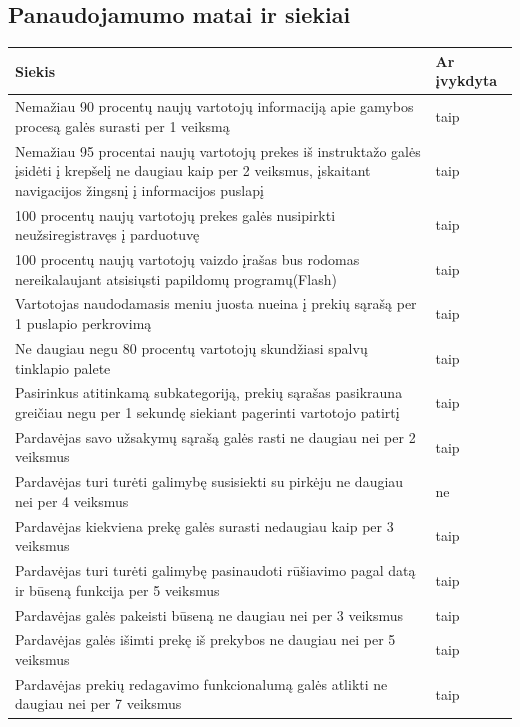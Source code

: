 \documentclass[oneside]{VUMIFPSkursinis}
\begin{document}
\subsection{Panaudojamumo matai ir siekiai}
\begin{center}
    \begin{tabular}{ |p{12cm}| p{3cm} |}
    \hline
	Siekis &Ar įvykdyta \\ \hline
	Nemažiau 90 procentų naujų vartotojų informaciją apie gamybos procesą galės surasti per 1 veiksmą& taip \\ \hline
	Nemažiau 95 procentai naujų vartotojų prekes iš instruktažo galės įsidėti į krepšelį ne daugiau kaip per 2 veiksmus, įskaitant navigacijos žingsnį į informacijos puslapį& taip \\ \hline
	100 procentų naujų vartotojų prekes galės nusipirkti neužsiregistravęs į parduotuvę& taip \\ \hline
	100 procentų naujų vartotojų vaizdo įrašas bus rodomas nereikalaujant atsisiųsti papildomų programų(Flash) & taip \\ \hline
	Vartotojas naudodamasis meniu juosta nueina į prekių sąrašą per 1 puslapio perkrovimą & taip \\ \hline
	Ne daugiau negu 80 procentų vartotojų skundžiasi spalvų tinklapio palete & taip \\ \hline
	Pasirinkus atitinkamą subkategoriją, prekių sąrašas pasikrauna greičiau negu per 1 sekundę siekiant pagerinti vartotojo patirtį & taip \\ \hline
	Pardavėjas savo užsakymų sąrašą galės rasti ne daugiau nei per 2 veiksmus & taip \\ \hline
	Pardavėjas turi turėti galimybę susisiekti su pirkėju ne daugiau nei per 4 veiksmus & ne \\ \hline
	Pardavėjas kiekviena prekę galės surasti nedaugiau kaip per 3 veiksmus & taip \\ \hline
	Pardavėjas turi turėti galimybę pasinaudoti rūšiavimo pagal datą ir būseną funkcija per 5 veiksmus & taip \\ \hline
	Pardavėjas galės pakeisti būseną ne daugiau nei per 3 veiksmus & taip \\ \hline
	Pardavėjas galės išimti prekę iš prekybos ne daugiau nei per 5 veiksmus & taip \\ \hline
	Pardavėjas prekių redagavimo funkcionalumą galės atlikti ne daugiau nei per 7 veiksmus & taip \\ \hline
	
	
    \end{tabular}
\end{center}
		
\end{document}
